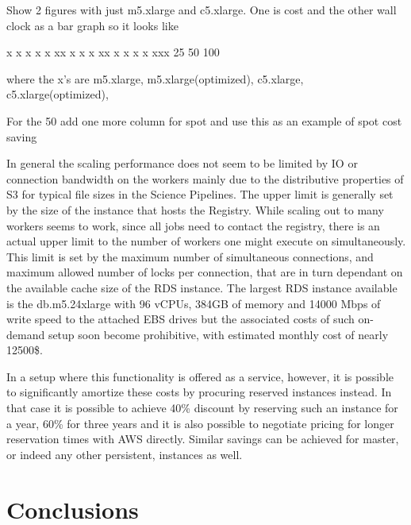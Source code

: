 \documentclass[a4paper, 10pt, conference]{ieeeconf}
\begin{document}
Show 2 figures with just m5.xlarge  and c5.xlarge. One is cost and the other wall clock as a bar graph so it looks like

x            x              x
x            x              xx
x            x x            xx
x x          x x            xxx
25           50             100

where the x's are m5.xlarge, m5.xlarge(optimized), c5.xlarge, c5.xlarge(optimized), 

For the 50 add one more column for spot and use this as an example of spot cost saving



In general the scaling performance does not seem to be limited by IO or connection bandwidth on the workers mainly due to the distributive properties of S3 for typical file sizes in the Science Pipelines. The upper limit is generally set by the size of the instance that hosts the Registry. While scaling out to many workers seems to work, since all jobs need to contact the registry, there is an actual upper limit to the number of workers one might execute on simultaneously. This limit is set by the maximum number of simultaneous connections, and maximum allowed number of locks per connection, that are in turn dependant on the available cache size of the RDS instance. The largest RDS instance available is the db.m5.24xlarge with 96 vCPUs, 384GB of memory and 14000 Mbps of write speed to the attached EBS drives but the associated costs of such on-demand setup soon become prohibitive, with estimated monthly cost of nearly 12500\$. 

In a setup where this functionality is offered as a service, however, it is possible to significantly amortize these costs by procuring reserved instances instead. In that case it is possible to achieve 40\% discount by reserving such an instance for a year, 60\% for three years and it is also possible to negotiate pricing for longer reservation times with AWS directly. Similar savings can be achieved for master, or indeed any other persistent, instances as well. 


\section{Conclusions}
\end{document}
